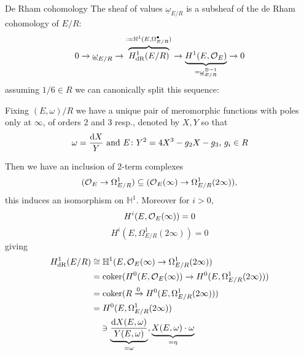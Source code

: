 \begin{frame}{De Rham cohomology}
    The sheaf of values $\underline \omega_{E/R}$ is a subsheaf of the de Rham cohomology of $E/R$:
    \[0\to \underline \omega_{E/R} \to \overbrace{H^1_{\mathrm{dR}}(E/R)}^{ := \mathbb H^1(E, \Omega^\bullet_{E/R})} \to \underbrace{ H^1 (E, \operatorname{\mathcal{O}}_E)}_{=\underline \omega_{E/R}^{\otimes-1}} \to 0\]\pause
    assuming $1/6\in R$ we can canonically split this sequence:

    Fixing $(E, \omega)/R$ we have a unique pair of meromorphic functions with poles only at $\infty$, of orders $2$ and $3$ resp., denoted by $X,Y$ so that
    \[ \omega = \frac{\mathop{}\!\mathrm{d} X }{Y}\text{ and } E \colon Y^2 = 4X^3  - g_2X - g_3,\,g_i\in R\]
\end{frame}

\begin{frame}
    Then we have an inclusion of 2-term complexes
    \[
        (\operatorname{\mathcal{O}}_E \to \Omega_{E/R}^1) \subseteq (\operatorname{\mathcal{O}}_{E}(\infty) \to  \Omega_{E/R}^1 (2\infty))\text,
    \]\pause
    this induces an isomorphism on $\mathbb H^1$.
    Moreover for $i\gt0$,
    \[ H^i(E, \operatorname{\mathcal{O}}_E(\infty)) = 0 \]
    \[ H^i(E, \Omega^1_{E/R}(2\infty)) = 0 \]
    giving
    \begin{align*}
        H^1_{\mathrm{dR}}(E/R) &\cong \mathbb H^1(E, \operatorname{\mathcal{O}}_E(\infty) \to  \Omega^1_{E/R}(2\infty))\\
        &= \operatorname{coker}( H^0(E, \operatorname{\mathcal{O}}_E(\infty)) \to H^0(E, \Omega^1_{E/R}(2\infty)))\\
        &= \operatorname{coker}( R \xrightarrow 0  H^0(E, \Omega^1_{E/R}(2\infty)))        \\
        &= H^0(E, \Omega^1_{E/R}(2\infty))\\
        & \quad\ni \underbrace{\frac{\mathop{}\!\mathrm{d} X(E, \omega)}{Y(E, \omega)}}_{=\omega},
        \underbrace{X(E, \omega)\cdot  \omega}_{=\eta}
    \end{align*}
\end{frame}

